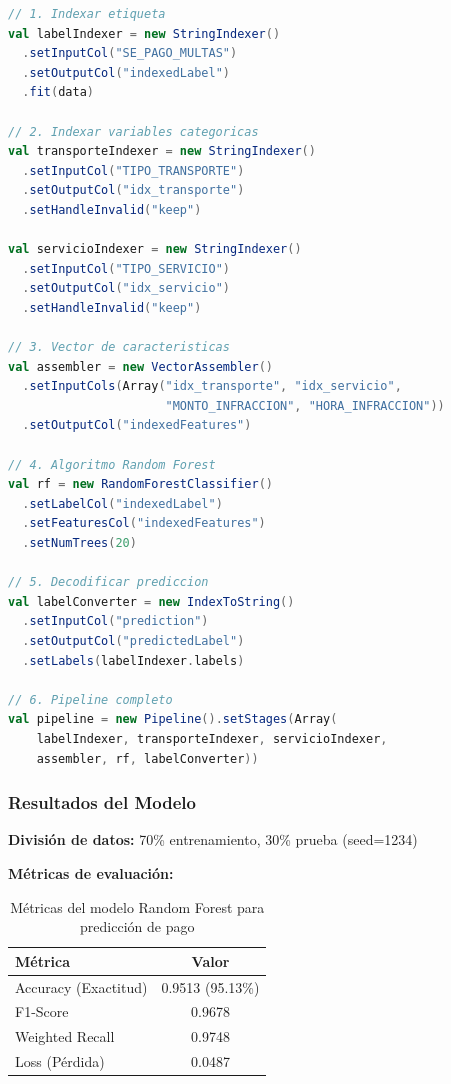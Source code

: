 \documentclass[12pt,a4paper]{article}
\begin{document}
\begin{lstlisting}[language=Scala, caption={Pipeline Random Forest}]
// 1. Indexar etiqueta
val labelIndexer = new StringIndexer()
  .setInputCol("SE_PAGO_MULTAS")
  .setOutputCol("indexedLabel")
  .fit(data)

// 2. Indexar variables categoricas
val transporteIndexer = new StringIndexer()
  .setInputCol("TIPO_TRANSPORTE")
  .setOutputCol("idx_transporte")
  .setHandleInvalid("keep")

val servicioIndexer = new StringIndexer()
  .setInputCol("TIPO_SERVICIO")
  .setOutputCol("idx_servicio")
  .setHandleInvalid("keep")

// 3. Vector de caracteristicas
val assembler = new VectorAssembler()
  .setInputCols(Array("idx_transporte", "idx_servicio", 
                      "MONTO_INFRACCION", "HORA_INFRACCION"))
  .setOutputCol("indexedFeatures")

// 4. Algoritmo Random Forest
val rf = new RandomForestClassifier()
  .setLabelCol("indexedLabel")
  .setFeaturesCol("indexedFeatures")
  .setNumTrees(20)

// 5. Decodificar prediccion
val labelConverter = new IndexToString()
  .setInputCol("prediction")
  .setOutputCol("predictedLabel")
  .setLabels(labelIndexer.labels)

// 6. Pipeline completo
val pipeline = new Pipeline().setStages(Array(
    labelIndexer, transporteIndexer, servicioIndexer, 
    assembler, rf, labelConverter))
\end{lstlisting}

\subsubsection{Resultados del Modelo}

\textbf{División de datos:} 70\% entrenamiento, 30\% prueba (seed=1234)

\textbf{Métricas de evaluación:}

\begin{table}[H]
\centering
\begin{tabular}{lc}
\toprule
\textbf{Métrica} & \textbf{Valor} \\
\midrule
Accuracy (Exactitud) & 0.9513 (95.13\%) \\
F1-Score & 0.9678 \\
Weighted Recall & 0.9748 \\
Loss (Pérdida) & 0.0487 \\
\bottomrule
\end{tabular}
\caption{Métricas del modelo Random Forest para predicción de pago}
\label{tab:rf_metricas}
\end{table}
\end{document}
